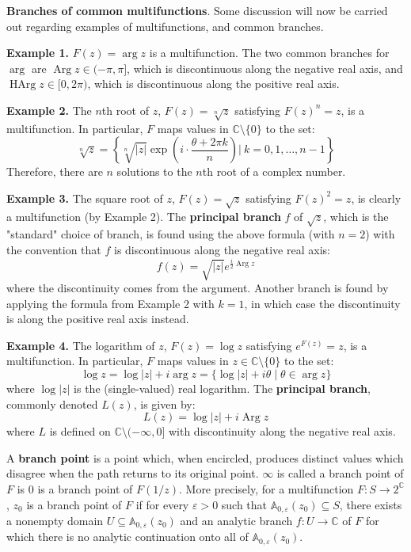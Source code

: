 \begin{shaded}
    \textbf{Branches of common multifunctions}. Some discussion will now be carried out regarding examples of multifunctions, and common branches.

    \textbf{Example 1.} $F(z) = \arg z$ is a multifunction. The two common branches for $\arg$ are $\operatorname{Arg}z \in (-\pi, \pi]$, which is discontinuous along the negative real axis, and $\operatorname{HArg}z \in [0,2\pi)$, which is discontinuous along the positive real axis.

    \textbf{Example 2.} The $n$th root of $z$, $F(z)=\sqrt[n]{z}$ satisfying $F(z)^n=z$, is a multifunction. In particular, $F$ maps values in $\mathbb{C}\setminus \{0\}$ to the set: \[\sqrt[n]{z} = \left\{\sqrt[n]{|z|}\exp\left(i\cdot \frac{\theta + 2\pi k}{n}\right)\bigg|\  k = 0,1,\dots,n-1\right\}\] Therefore, there are $n$ solutions to the $n$th root of a complex number.

    \textbf{Example 3.} The square root of $z$, $F(z)=\sqrt{z}$ satisfying $F(z)^2 = z$, is clearly a multifunction (by Example 2). The \textbf{principal branch} $f$ of $\sqrt{z}$, which is the "standard" choice of branch, is found using the above formula (with $n=2$) with the convention that $f$ is discontinuous along the negative real axis: \[f(z) = \sqrt{|z|}e^{\frac{i}{2}\operatorname{Arg} z}\] where the discontinuity comes from the argument. Another branch is found by applying the formula from Example 2 with $k=1$, in which case the discontinuity is along the positive real axis instead.

    \textbf{Example 4.} The logarithm of $z$, $F(z)=\log z$ satisfying $e^{F(z)} = z$, is a multifunction. In particular, $F$ maps values in $z\in\mathbb{C}\setminus \{0\}$ to the set: \[\log z = \log|z| + i\arg z = \{\log |z| + i \theta\mid \theta\in\arg z\}\] where $\log|z|$ is the (single-valued) real logarithm. The \textbf{principal branch}, commonly denoted $L(z)$, is given by: \[L(z) = \log |z| + i\operatorname{Arg} z\] where $L$ is defined on $\mathbb{C}\setminus (-\infty, 0]$ with discontinuity along the negative real axis.
\end{shaded}

A \textbf{branch point} is a point which, when encircled, produces distinct values which disagree when the path returns to its original point. $\infty$ is called a branch point of $F$ is $0$ is a branch point of $F(1/z)$. More precisely, for a multifunction $F:S\to2^\mathbb{C}$, $z_0$ is a branch point of $F$ if for every $\varepsilon>0$ such that $\mathbb{A}_{0,\varepsilon}(z_0)\subseteq S$, there exists a nonempty domain $U\subseteq\mathbb{A}_{0,\varepsilon}(z_0)$ and an analytic branch $f:U\to \mathbb{C}$ of $F$ for which there is no analytic continuation onto all of $\mathbb{A}_{0,\varepsilon}(z_0)$.

